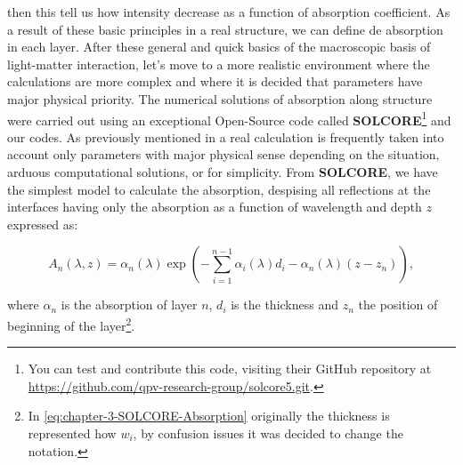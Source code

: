 then this tell us how intensity decrease as a function of absorption coefficient.  As a result of these basic principles in a real structure, we can define de absorption in each layer. After these general and quick basics of the macroscopic basis of light-matter interaction, let's move to a more realistic environment where the calculations are more complex and where it is decided that parameters have major physical priority. The numerical solutions of absorption along structure were carried out using an exceptional Open-Source code called \textbf{SOLCORE}\cite{alonso2018solcore}\footnote{You can test and contribute this code, visiting their GitHub repository at \url{https://github.com/qpv-research-group/solcore5.git}. } and our codes. As previously mentioned in a real calculation is frequently taken into account only parameters with major physical sense depending on the situation, arduous computational solutions, or for simplicity. From \textbf{SOLCORE}, we have the simplest model to calculate the absorption, despising all reflections at the interfaces having only the absorption as a function of wavelength and depth $z$ expressed as: 


\begin{equation}
	A_{n}(\lambda,z) = \alpha_{n}(\lambda)\exp\left(-\sum\limits_{i=1}^{n-1}\alpha_{i}\left(\lambda\right)d_i-\alpha_{n}\left(\lambda\right)\left(z-z_{n}\right)\right),
	\label{eq:chapter-3-SOLCORE-Absorption}
\end{equation}

where $\alpha_{n}$ is the absorption of layer $n$, $d_{i}$ is the thickness and $z_{n}$ the position of beginning of the layer\footnote{In \cref{eq:chapter-3-SOLCORE-Absorption} originally the thickness is represented how $w_i$, by confusion issues it was decided to change the notation.   }. 

